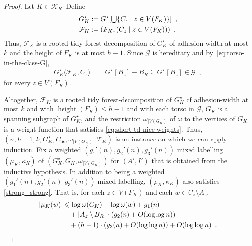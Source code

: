 \documentclass{patmorin}
\let\eqref\cref
\renewcommand{\le}{\leqslant}
\newcommand{\torso}[2]{{#1}\langle{#2}\rangle}
\DeclareMathOperator{\height}{height}
\newcommand{\Oh}{O}
\DeclarePairedDelimiter{\set}{\{}{\}}
\begin{document}
\begin{proof}
  Let $K\in\mathcal{K}_R$. Define
  \begin{align*}
    G^\star_K
     & :=G^\star[\textstyle\bigcup\set{C_z\mid z\in V(F_K)}]\enspace, \\
    \mathcal{F}_K
     & :=(F_K, (C_z \mid z\in V(F_K)))\enspace.
  \end{align*}
  Thus, $\mathcal{F}_K$ is a rooted tidy forest-decomposition of $G^\star_K$ of adhesion-width at most $k$ and the height of $F_K$ is at most $h-1$.
  Since $\mathcal{G}$ is hereditary and by~\eqref{eq:torso-in-the-class-G},
  \begin{align*}
    \torso{G^\star_K}{\mathcal{F}_K,C_z}
     & =G^\star[B_z]-B_R\subseteq G^\star[B_z]\in \mathcal{G}\enspace ,
  \end{align*}
  for every $z \in V(F_K)$.

  Altogether, $\mathcal{F}_K$ is a rooted tidy forest-decomposition of $G^\star_K$ of adhesion-width at most $k$ and with $\height(F_K)\le h-1$ and with each torso in $\mathcal{G}$, $G_K$ is a spanning subgraph of $G^\star_K$, and the restriction
  $\omega_{|V(G_K)}$ of $\omega$ to the vertices of $G_K$ is a weight function that satisfies \eqref{eq:short-td-nice-weights}.  Thus, $(n,h-1,k,G^\star_K,G_K,\omega_{|V(G_K)},\mathcal{F}_K)$ is an instance on which we can apply induction.
  Fix a weighted $(g_1'(n),g_2'(n),g_3'(n))$ mixed labelling $(\mu_K,\kappa_K)$ of $(G^\star_K,G_K,\omega_{|V(G_K)})$ for $(A',I')$ that is obtained from the inductive hypothesis.
  In addition to being a weighted $(g_1'(n),g_2'(n),g_3'(n))$ mixed labelling, $(\mu_K,\kappa_K)$ also satisfies \eqref{strong_strong}.  That is, for each $z\in V(F_K)$ and each $w\in C_z\setminus A_z$,
  \begin{align}
    |\mu_K(w)|
     & \le \log \omega(G_K) - \log\omega(w) + g_1(n) \notag                                \\
     & \quad {} + |A_z\setminus B_R|\cdot (g_2(n) + \Oh(\log\log n)) \label{mu_Kw}         \\
     & \quad {} + (h-1)\cdot (g_3(n) + \Oh(\log\log n)) +\Oh(\log\log n) \enspace . \notag
  \end{align}


\end{proof}
\end{document}

